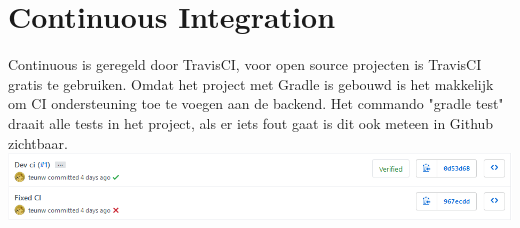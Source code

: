\chapter{Continuous Integration}
Continuous is geregeld door TravisCI, voor open source projecten is TravisCI gratis te gebruiken.
Omdat het project met Gradle is gebouwd is het makkelijk om CI ondersteuning toe te voegen aan de backend.
Het commando "gradle test" draait alle tests in het project, als er iets fout gaat is dit ook meteen in Github zichtbaar.
\linebreak
\includegraphics[width=\textwidth]{images/TravisCI.png}